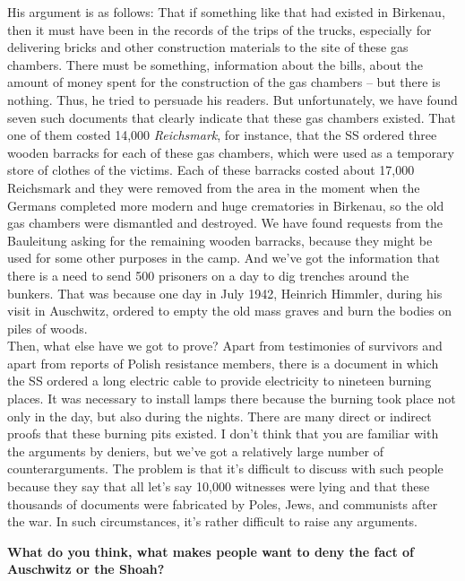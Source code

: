 His argument is as follows: That if something like that had existed in Birkenau, then it must have been in the records of the trips of the trucks, especially for delivering bricks and other construction materials to the site of these gas chambers. There must be something, information about the bills, about the amount of money spent for the construction of the gas chambers – but there is nothing. Thus, he tried to persuade his readers. But unfortunately, we have found seven such documents that clearly indicate that these gas chambers existed. That one of them costed 14,000 \textit{Reichsmark}, for instance, that the SS ordered three wooden barracks for each of these gas chambers, which were used as a temporary store of clothes of the victims. Each of these barracks costed about 17,000 Reichsmark and they were removed from the area in the moment when the Germans completed more modern and huge crematories in Birkenau, so the old gas chambers were dismantled and destroyed. We have found requests from the Bauleitung asking for the remaining wooden barracks, because they might be used for some other purposes in the camp. And we’ve got the information that there is a need to send 500 prisoners on a day to dig trenches around the bunkers. That was because one day in July 1942, Heinrich Himmler, during his visit in Auschwitz, ordered to empty the old mass graves and burn the bodies on piles of woods.\\ 
Then, what else have we got to prove? Apart from testimonies of survivors and apart from reports of Polish resistance members, there is a document in which the SS ordered a long electric cable to provide electricity to nineteen burning places. It was necessary to install lamps there because the burning took place not only in the day, but also during the nights. There are many direct or indirect proofs that these burning pits existed. I don’t think that you are familiar with the arguments by deniers, but we’ve got a relatively large number of counterarguments. The problem is that it’s difficult to discuss with such people because they say that all let's say 10,000 witnesses were lying and that these thousands of documents were fabricated by Poles, Jews, and communists after the war. In such circumstances, it’s rather difficult to raise any arguments.

\textbf{What do you think, what makes people want to deny the fact of Auschwitz or the Shoah?}

